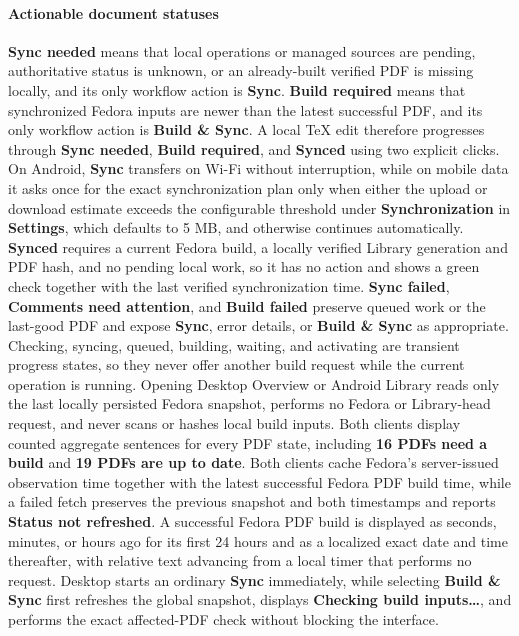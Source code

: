 {\paragraph{Actionable document statuses}
\textbf{Sync needed} means that local operations or managed sources are pending, authoritative status is unknown, or an already-built verified PDF is missing locally, and its only workflow action is \textbf{Sync}.
\textbf{Build required} means that synchronized Fedora inputs are newer than the latest successful PDF, and its only workflow action is \textbf{Build \& Sync}.
A local TeX edit therefore progresses through \textbf{Sync needed}, \textbf{Build required}, and \textbf{Synced} using two explicit clicks.
On Android, \textbf{Sync} transfers on Wi-Fi without interruption, while on mobile data it asks once for the exact synchronization plan only when either the upload or download estimate exceeds the configurable threshold under \textbf{Synchronization} in \textbf{Settings}, which defaults to 5 MB, and otherwise continues automatically.
\textbf{Synced} requires a current Fedora build, a locally verified Library generation and PDF hash, and no pending local work, so it has no action and shows a green check together with the last verified synchronization time.
\textbf{Sync failed}, \textbf{Comments need attention}, and \textbf{Build failed} preserve queued work or the last-good PDF and expose \textbf{Sync}, error details, or \textbf{Build \& Sync} as appropriate.
Checking, syncing, queued, building, waiting, and activating are transient progress states, so they never offer another build request while the current operation is running.
Opening Desktop Overview or Android Library reads only the last locally persisted Fedora snapshot, performs no Fedora or Library-head request, and never scans or hashes local build inputs.
Both clients display counted aggregate sentences for every PDF state, including \textbf{16 PDFs need a build} and \textbf{19 PDFs are up to date}.
Both clients cache Fedora's server-issued observation time together with the latest successful Fedora PDF build time, while a failed fetch preserves the previous snapshot and both timestamps and reports \textbf{Status not refreshed}.
A successful Fedora PDF build is displayed as seconds, minutes, or hours ago for its first 24 hours and as a localized exact date and time thereafter, with relative text advancing from a local timer that performs no request.
Desktop starts an ordinary \textbf{Sync} immediately, while selecting \textbf{Build \& Sync} first refreshes the global snapshot, displays \textbf{Checking build inputs\ldots}, and performs the exact affected-PDF check without blocking the interface.
}

